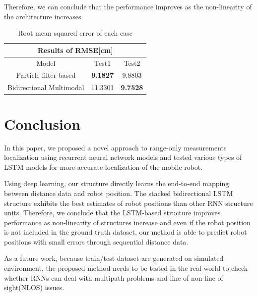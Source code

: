 \documentclass[letterpaper, 10 pt, conference]{ieeeconf}  %
\begin{document}
 Therefore, we can conclude that the performance improves as the non-linearity of the architecture increases.
 
 
\begin{table}[h]
	\centering
	\begin{tabular}{cclcl}
		\hline
		\multicolumn{5}{c}{Results of RMSE{[}cm{]}}                                                                  \\ \hline
		\multicolumn{1}{c|}{Model}                    & \multicolumn{2}{c|}{Test1} & \multicolumn{2}{c}{Test2}      \\ \hline
		\multicolumn{1}{c|}{Particle filter-based}    & \multicolumn{2}{c|}{\textbf{9.1827}}     & \multicolumn{2}{c}{9.8803}          \\
		\multicolumn{1}{c|}{Bidirectional Multimodal} & \multicolumn{2}{c|}{11.3301}     & \multicolumn{2}{c}{\textbf{9.7528}}
	\end{tabular}
	\caption{Root mean squared error of each case}
	\label{RMSE_table}
\end{table}


\section{Conclusion}

In this paper, we proposed a novel approach to range-only measurements localization using recurrent neural network models and tested various types of LSTM models for more accurate localization of the mobile robot. 

Using deep learning, our structure directly learns the end-to-end mapping between distance data and robot position. The stacked bidirectional LSTM structure exhibits the best estimates of robot positions than other RNN structure units. Therefore, we conclude that  the LSTM-based structure improves performance as non-linearity of structures increase and even if the robot position is not included in the ground truth dataset, our method is able to predict robot positions with small errors through sequential distance data. 

As a future work, because train/test dataset are generated on simulated environment, the proposed method needs to be tested in the real-world to check whether RNNs can deal with multipath problems and line of non-line of sight(NLOS) issues.


\end{document}
